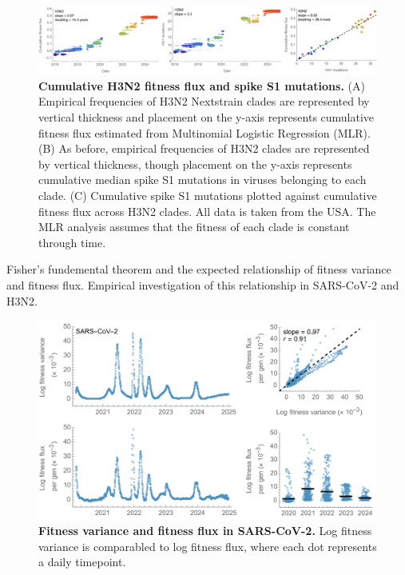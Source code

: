 \documentclass[11pt,oneside,letterpaper]{article}
\begin{document}
\begin{figure}[h]
	\centering
	\includegraphics[width=1.0\textwidth]{figures/h3n2_clades_fitnesses_mutations}
	\caption{\textbf{Cumulative H3N2 fitness flux and spike S1 mutations.}
  (A) Empirical frequencies of H3N2 Nextstrain clades are represented by vertical thickness and placement on the y-axis represents cumulative fitness flux estimated from Multinomial Logistic Regression (MLR).
  (B) As before, empirical frequencies of H3N2 clades are represented by vertical thickness, though placement on the y-axis represents cumulative median spike S1 mutations in viruses belonging to each clade.
  (C) Cumulative spike S1 mutations plotted against cumulative fitness flux across H3N2 clades.
	All data is taken from the USA.
  The MLR analysis assumes that the fitness of each clade is constant through time.
	}
	\label{h3n2_clades_fitnesses_mutations}
\end{figure}

Fisher's fundemental theorem and the expected relationship of fitness variance and fitness flux.
Empirical investigation of this relationship in SARS-CoV-2 and H3N2.

\begin{figure}[h]
	\centering
	\includegraphics[width=1.0\textwidth]{figures/sarscov2_clades_fitness_variance_vs_flux}
	\caption{\textbf{Fitness variance and fitness flux in SARS-CoV-2.}
  Log fitness variance is comparabled to log fitness flux, where each dot represents a daily timepoint.
	}
	\label{sarscov2_clades_fitness_variance_vs_flux}
\end{figure}
\end{document}
